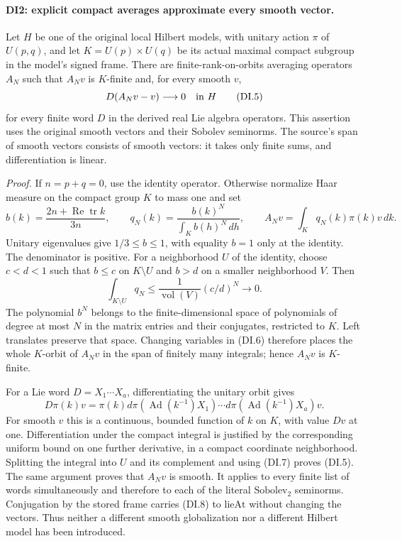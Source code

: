 \paragraph{DI2: explicit compact averages approximate every smooth vector.}
\label{claim:DI2}
Let \(H\) be one of the original local Hilbert models, with unitary
action \(\pi\) of \(U(p,q)\), and let \(K=U(p)\times U(q)\) be its
actual maximal compact subgroup in the model's signed frame.
There are finite-rank-on-orbits averaging operators \(A_N\) such that
\(A_Nv\) is \(K\)-finite and, for every smooth \(v\),
\[
             D(A_Nv-v)\longrightarrow0\quad\hbox{in }H
 \tag{DI.5}
\]
for every finite word \(D\) in the derived real Lie algebra operators.
This assertion uses the original smooth vectors and their Sobolev
seminorms. The source's span of smooth vectors consists of smooth
vectors: it takes only finite sums, and differentiation is linear.

\emph{Proof.}
If \(n=p+q=0\), use the identity operator. Otherwise normalize Haar
measure on the compact group \(K\) to mass one and set
\[
 b(k)=\frac{2n+\operatorname{Re}\operatorname{tr}k}{3n},
 \qquad q_N(k)=\frac{b(k)^N}{\int_K b(h)^N\,dh},
 \qquad A_Nv=\int_Kq_N(k)\pi(k)v\,dk.
 \tag{DI.6}
\]
Unitary eigenvalues give \(1/3\le b\le1\), with equality \(b=1\)
only at the identity. The denominator is positive. For a neighborhood
\(U\) of the identity, choose \(c<d<1\) such that \(b\le c\) on
\(K\setminus U\) and \(b>d\) on a smaller neighborhood \(V\).
Then
\[
          \int_{K\setminus U}q_N
              \le \frac{1}{\operatorname{vol}(V)}(c/d)^N
              \longrightarrow0.
 \tag{DI.7}
\]
The polynomial \(b^N\) belongs to the finite-dimensional space of
polynomials of degree at most \(N\) in the matrix entries and their
conjugates, restricted to \(K\). Left translates preserve that space.
Changing variables in (DI.6) therefore places the whole \(K\)-orbit
of \(A_Nv\) in the span of finitely many integrals; hence \(A_Nv\)
is \(K\)-finite.

For a Lie word \(D=X_1\cdots X_a\), differentiating the unitary
orbit gives
\[
 D\pi(k)v=\pi(k)
       d\pi(\operatorname{Ad}(k^{-1})X_1)\cdots
       d\pi(\operatorname{Ad}(k^{-1})X_a)v.
 \tag{DI.8}
\]
For smooth \(v\) this is a continuous, bounded function of \(k\)
on \(K\), with value \(Dv\) at one. Differentiation under the
compact integral is justified by the corresponding uniform bound on
one further derivative, in a compact coordinate neighborhood. Splitting
the integral into \(U\) and its complement and using (DI.7) proves
(DI.5). The same argument proves that \(A_Nv\) is smooth. It applies
to every finite list of words simultaneously and therefore to each
of the literal \(\mathrm{Sobolev}_2\) seminorms. Conjugation by the
stored frame carries (DI.8) to \(\mathrm{lieAt}\) without changing
the vectors. Thus neither a different smooth globalization nor a
different Hilbert model has been introduced.

